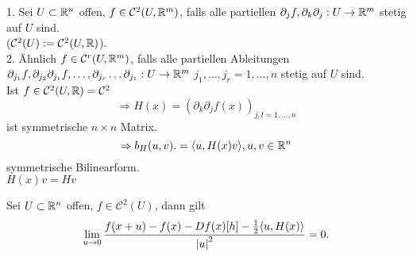 \documentclass[../ana2.tex]{subfiles}
\begin{document}
\begin{defi}
    1. Sei \(U \subset \mathbb{R}^n\) offen, 
    \(f \in \mathcal{C}^2(U, \mathbb{R}^m)\), falls alle
    partiellen \(\partial_jf, \partial_k \partial_j:U\rightarrow \mathbb{R}^m\) stetig auf \(U\) sind.\\
    (\( \mathcal{C}^2(U) := \mathcal{C}^2(U, \mathbb{R}) \)).\\
    2. Ähnlich \(f \in \mathcal{C}^r(U, \mathbb{R}^m)\), 
    falls alle partiellen Ableitungen
    \( \partial_{j_1}f, \partial_{j_2}\partial_{j_1}f, \ldots, 
    \partial_{j_r}\ldots \partial_{j_1}:U\rightarrow \mathbb{R}^m \)
    \( j_1, \ldots, j_r = 1, \ldots, n \) stetig auf \(U\) sind.\\
    Ist \(f \in \mathcal{C}^2(U,\mathbb{R}) = \mathcal{C}^2\)
    \[ \Rightarrow H(x) = (\partial_k \partial_j f(x))_{j,l 
    = 1,\ldots, n} \]
    ist symmetrische \(n\times n \) Matrix.
    \[ \Rightarrow b_H(u,v) .= \langle u, H(x)v \rangle, u,v \in \mathbb{R}^n \]
    symmetrische Bilinearform.\\
    \( H(x)v = H v \)
\end{defi}
\begin{lem}
    Sei \(U \subset \mathbb{R}^n\) offen, \(f \in \mathcal{C}^2(U)\), 
    dann gilt
    \[ \lim\limits_{u\rightarrow{}0} \frac{f(x+u) - f(x) - Df(x)[h] - \frac{1}{2} 
    \langle u, H(x) \rangle}{\left|u\right|^2} = 0. \]
\end{lem}
\end{document}
